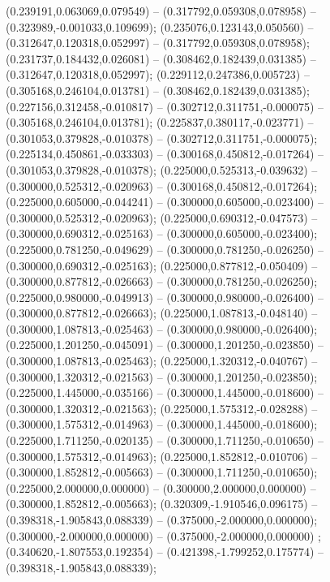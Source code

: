 (0.239191,0.063069,0.079549) -- (0.317792,0.059308,0.078958) -- (0.323989,-0.001033,0.109699);
 (0.235076,0.123143,0.050560) -- (0.312647,0.120318,0.052997) -- (0.317792,0.059308,0.078958);
 (0.231737,0.184432,0.026081) -- (0.308462,0.182439,0.031385) -- (0.312647,0.120318,0.052997);
 (0.229112,0.247386,0.005723) -- (0.305168,0.246104,0.013781) -- (0.308462,0.182439,0.031385);
 (0.227156,0.312458,-0.010817) -- (0.302712,0.311751,-0.000075) -- (0.305168,0.246104,0.013781);
 (0.225837,0.380117,-0.023771) -- (0.301053,0.379828,-0.010378) -- (0.302712,0.311751,-0.000075);
 (0.225134,0.450861,-0.033303) -- (0.300168,0.450812,-0.017264) -- (0.301053,0.379828,-0.010378);
 (0.225000,0.525313,-0.039632) -- (0.300000,0.525312,-0.020963) -- (0.300168,0.450812,-0.017264);
 (0.225000,0.605000,-0.044241) -- (0.300000,0.605000,-0.023400) -- (0.300000,0.525312,-0.020963);
 (0.225000,0.690312,-0.047573) -- (0.300000,0.690312,-0.025163) -- (0.300000,0.605000,-0.023400);
 (0.225000,0.781250,-0.049629) -- (0.300000,0.781250,-0.026250) -- (0.300000,0.690312,-0.025163);
 (0.225000,0.877812,-0.050409) -- (0.300000,0.877812,-0.026663) -- (0.300000,0.781250,-0.026250);
 (0.225000,0.980000,-0.049913) -- (0.300000,0.980000,-0.026400) -- (0.300000,0.877812,-0.026663);
 (0.225000,1.087813,-0.048140) -- (0.300000,1.087813,-0.025463) -- (0.300000,0.980000,-0.026400);
 (0.225000,1.201250,-0.045091) -- (0.300000,1.201250,-0.023850) -- (0.300000,1.087813,-0.025463);
 (0.225000,1.320312,-0.040767) -- (0.300000,1.320312,-0.021563) -- (0.300000,1.201250,-0.023850);
 (0.225000,1.445000,-0.035166) -- (0.300000,1.445000,-0.018600) -- (0.300000,1.320312,-0.021563);
 (0.225000,1.575312,-0.028288) -- (0.300000,1.575312,-0.014963) -- (0.300000,1.445000,-0.018600);
 (0.225000,1.711250,-0.020135) -- (0.300000,1.711250,-0.010650) -- (0.300000,1.575312,-0.014963);
 (0.225000,1.852812,-0.010706) -- (0.300000,1.852812,-0.005663) -- (0.300000,1.711250,-0.010650);
 (0.225000,2.000000,0.000000) -- (0.300000,2.000000,0.000000) -- (0.300000,1.852812,-0.005663);
 (0.320309,-1.910546,0.096175) -- (0.398318,-1.905843,0.088339) -- (0.375000,-2.000000,0.000000);
 (0.300000,-2.000000,0.000000) -- (0.375000,-2.000000,0.000000) ;
 (0.340620,-1.807553,0.192354) -- (0.421398,-1.799252,0.175774) -- (0.398318,-1.905843,0.088339);
